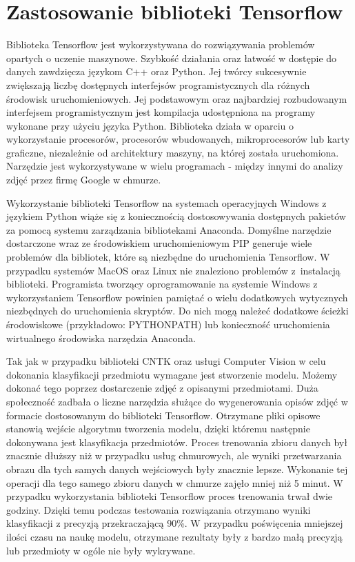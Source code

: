 {\section{Zastosowanie biblioteki Tensorflow}{
Biblioteka Tensorflow\cite{Tensorflow} jest wykorzystywana do rozwiązywania problemów opartych o uczenie maszynowe. Szybkość działania oraz łatwość w dostępie do danych zawdzięcza językom C++ oraz Python. Jej twórcy sukcesywnie zwiększają liczbę dostępnych interfejsów programistycznych dla różnych środowisk uruchomieniowych. Jej podstawowym oraz najbardziej rozbudowanym interfejsem programistycznym jest kompilacja udostępniona na programy wykonane przy użyciu języka Python. Biblioteka działa w oparciu o wykorzystanie procesorów, procesorów wbudowanych, mikroprocesorów lub karty graficzne, niezależnie od architektury maszyny, na której została uruchomiona. Narzędzie jest wykorzystywane w wielu programach - między innymi do analizy zdjęć przez firmę Google w chmurze. 

Wykorzystanie biblioteki Tensorflow na systemach operacyjnych Windows z językiem Python wiąże się z koniecznością dostosowywania dostępnych pakietów za pomocą systemu zarządzania bibliotekami Anaconda\cite{Anaconda}. Domyślne narzędzie dostarczone wraz ze środowiskiem uruchomieniowym PIP generuje wiele problemów dla bibliotek, które są niezbędne do uruchomienia Tensorflow. W przypadku systemów MacOS oraz Linux nie znaleziono problemów z~instalacją biblioteki. Programista tworzący oprogramowanie na systemie Windows z wykorzystaniem Tensorflow powinien pamiętać o wielu dodatkowych wytycznych niezbędnych do uruchomienia skryptów. Do nich mogą należeć dodatkowe ścieżki środowiskowe (przykładowo: PYTHONPATH) lub konieczność uruchomienia wirtualnego środowiska narzędzia Anaconda. 

Tak jak w przypadku biblioteki CNTK oraz usługi Computer Vision w celu dokonania klasyfikacji przedmiotu wymagane jest stworzenie modelu. Możemy dokonać tego poprzez dostarczenie zdjęć z opisanymi przedmiotami. Duża społeczność zadbała o liczne narzędzia służące do wygenerowania opisów zdjęć w formacie dostosowanym do biblioteki Tensorflow. Otrzymane pliki opisowe stanowią wejście algorytmu tworzenia modelu, dzięki któremu następnie dokonywana jest klasyfikacja przedmiotów. Proces trenowania zbioru danych był znacznie dłuższy niż w przypadku usług chmurowych, ale wyniki przetwarzania obrazu dla tych samych danych wejściowych były znacznie lepsze. Wykonanie tej operacji dla tego samego zbioru danych w chmurze zajęło mniej niż 5 minut. W przypadku wykorzystania biblioteki Tensorflow proces trenowania trwał dwie godziny. Dzięki temu podczas testowania rozwiązania otrzymano wyniki klasyfikacji z precyzją przekraczającą 90\%. W przypadku poświęcenia mniejszej ilości czasu na naukę modelu, otrzymane rezultaty były z bardzo małą precyzją lub przedmioty w ogóle nie były wykrywane.

}}
